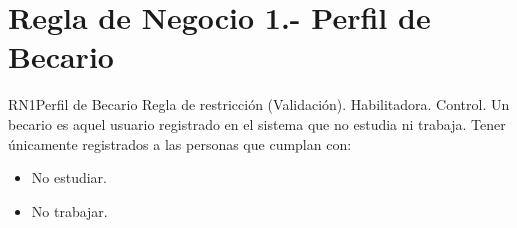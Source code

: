 \section{Regla de Negocio 1.- Perfil de Becario}

\begin{BussinesRule}{RN1}{Perfil de Becario}
	\BRitem[Tipo:] Regla de restricción (Validación).
	\BRitem[Clase:] Habilitadora. 
	\BRitem[Nivel:] Control. %
	\BRitem[Descripción:] Un becario es aquel usuario registrado en el sistema que no estudia ni trabaja.
	\BRitem[Motivación:] Tener únicamente registrados a las personas que cumplan con:
	\begin{itemize}
	    \item No estudiar.
	    \item No trabajar.
	\end{itemize}
	
\end{BussinesRule}


